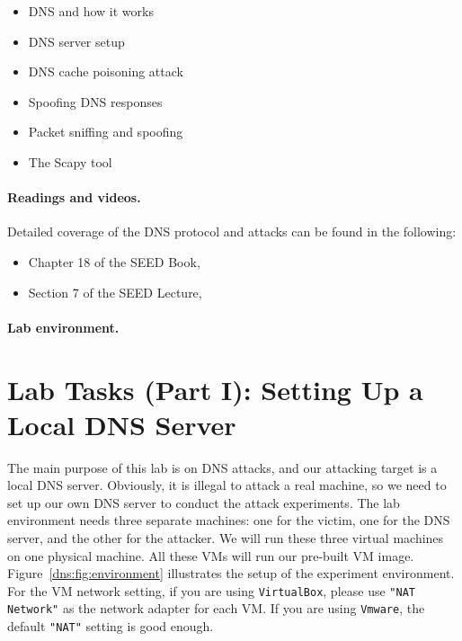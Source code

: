 \begin{itemize}[noitemsep]
\item DNS and how it works
\item DNS server setup
\item DNS cache poisoning attack
\item Spoofing DNS responses
\item Packet sniffing and spoofing
\item The Scapy tool
\end{itemize}


\paragraph{Readings and videos.}
Detailed coverage of the DNS protocol and attacks can be found in the following:

\begin{itemize}
\item Chapter 18 of the SEED Book, \seedbook
\item Section 7 of the SEED Lecture, \seedisvideo
\end{itemize}



\paragraph{Lab environment.} \seedenvironment



\section{Lab Tasks (Part I): Setting Up a Local DNS Server}

The main purpose of this lab is on DNS attacks, and our attacking target is
a local DNS server.  Obviously, it
is illegal to attack a real machine, so we need to set up our own DNS
server to  conduct the attack experiments. The lab 
environment needs three separate machines:
one for the victim, one for the DNS server, and the other for the attacker.
We will run these three virtual machines on one physical machine.
All these VMs will run our pre-built \ubuntu VM image.
Figure~\ref{dns:fig:environment} illustrates the setup of the experiment environment. 
For the VM network setting, if you
are using {\tt VirtualBox}, please use {\tt "NAT Network"} as the 
network adapter for each VM.  If you are using {\tt Vmware}, the default
{\tt "NAT"} setting is good enough.


